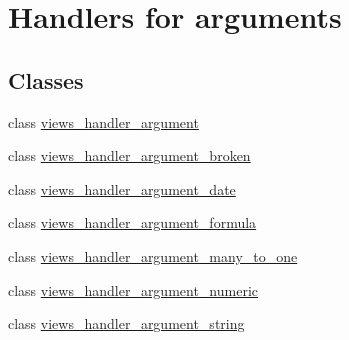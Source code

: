 \hypertarget{group__views__argument__handlers}{
\section{Handlers for arguments}
\label{group__views__argument__handlers}
}
\subsection*{Classes}
\begin{CompactItemize}
\item 
class \hyperlink{classviews__handler__argument}{views\_\-handler\_\-argument}
\item 
class \hyperlink{classviews__handler__argument__broken}{views\_\-handler\_\-argument\_\-broken}
\item 
class \hyperlink{classviews__handler__argument__date}{views\_\-handler\_\-argument\_\-date}
\item 
class \hyperlink{classviews__handler__argument__formula}{views\_\-handler\_\-argument\_\-formula}
\item 
class \hyperlink{classviews__handler__argument__many__to__one}{views\_\-handler\_\-argument\_\-many\_\-to\_\-one}
\item 
class \hyperlink{classviews__handler__argument__numeric}{views\_\-handler\_\-argument\_\-numeric}
\item 
class \hyperlink{classviews__handler__argument__string}{views\_\-handler\_\-argument\_\-string}
\end{CompactItemize}
